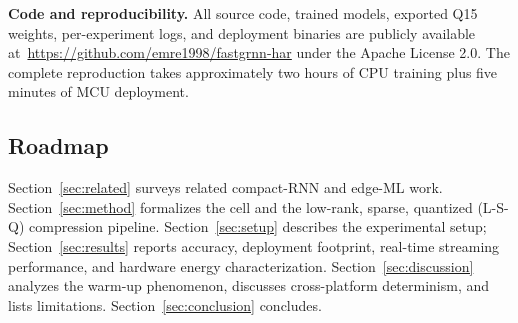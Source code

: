 \noindent\textbf{Code and reproducibility.} All source code,
trained models, exported Q15 weights, per-experiment logs, and
deployment binaries are publicly available
at~\url{https://github.com/emre1998/fastgrnn-har} under the
Apache License 2.0. The complete reproduction takes approximately
two hours of CPU training plus five minutes of MCU deployment.

\subsection{Roadmap}

Section~\ref{sec:related} surveys related compact-RNN and edge-ML
work. Section~\ref{sec:method} formalizes the \fastgrnn{} cell and
the low-rank, sparse, quantized (L-S-Q) compression pipeline.
Section~\ref{sec:setup} describes the experimental setup;
Section~\ref{sec:results} reports accuracy, deployment footprint,
real-time streaming performance, and hardware energy characterization.
Section~\ref{sec:discussion} analyzes the warm-up phenomenon,
discusses cross-platform determinism, and lists limitations.
Section~\ref{sec:conclusion} concludes.
